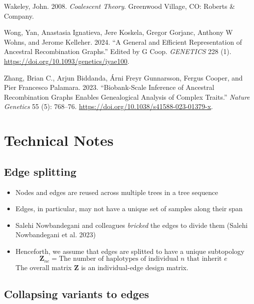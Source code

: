\documentclass[
  letterpaper,
  DIV=11,
  numbers=noendperiod]{scrartcl}
\providecommand{\tightlist}{%
  \setlength{\itemsep}{0pt}\setlength{\parskip}{0pt}}\usepackage{longtable,booktabs,array}
\newlength{\cslhangindent}
\newenvironment{CSLReferences}[2] %
 {\begin{list}{}{%
  \setlength{\itemindent}{0pt}
  \setlength{\leftmargin}{0pt}
  \setlength{\parsep}{0pt}
  \ifodd #1
   \setlength{\leftmargin}{\cslhangindent}
   \setlength{\itemindent}{-1\cslhangindent}
  \fi
  \setlength{\itemsep}{#2\baselineskip}}}
 {\end{list}}
\begin{document}
\begin{CSLReferences}{1}{0}
Wakeley, John. 2008. \emph{Coalescent Theory}. Greenwood Village, CO:
Roberts \& Company.

Wong, Yan, Anastasia Ignatieva, Jere Koskela, Gregor Gorjanc, Anthony W
Wohns, and Jerome Kelleher. 2024. {``A General and Efficient
Representation of Ancestral Recombination Graphs.''} Edited by G Coop.
\emph{GENETICS} 228 (1). \url{https://doi.org/10.1093/genetics/iyae100}.

Zhang, Brian C., Arjun Biddanda, Árni Freyr Gunnarsson, Fergus Cooper,
and Pier Francesco Palamara. 2023. {``Biobank-Scale Inference of
Ancestral Recombination Graphs Enables Genealogical Analysis of Complex
Traits.''} \emph{Nature Genetics} 55 (5): 768--76.
\url{https://doi.org/10.1038/s41588-023-01379-x}.

\end{CSLReferences}

\section{Technical Notes}\label{technical-notes}

\subsection{Edge splitting}\label{edge-splitting}

\begin{itemize}
\tightlist
\item
  Nodes and edges are reused across multiple trees in a tree sequence
\item
  Edges, in particular, may not have a unique set of samples along their
  span
\item
  Salehi Nowbandegani and colleagues \emph{bricked} the edges to divide
  them (Salehi Nowbandegani et al. 2023)
\item
  Henceforth, we assume that edges are splitted to have a unique
  subtopology \[
  \mathbf{Z}_{ne} = \text{The number of haplotypes of individual $n$ that inherit $e$} 
  \] The overall matrix \(\mathbf{Z}\) is an individual-edge design
  matrix.
\end{itemize}

\subsection{Collapsing variants to
edges}\label{collapsing-variants-to-edges}
\end{document}

